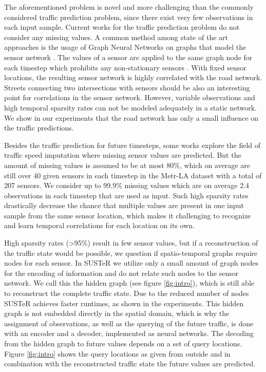 The aforementioned problem is novel and more challenging than the commonly considered traffic prediction problem, since there exist very few observations in each input sample.
Current works for the traffic prediction problem do not consider any missing values. \cite{Li2021, Shao22}
A common method among state of the art approaches is the usage of Graph Neural Networks on graphs that model the sensor network \cite{bui22}.
The values of a sensor are applied to the same graph node for each timestep which prohibits any non-stationary sensors . 
With fixed sensor locations, the resulting sensor network is highly correlated with the road network.
Streets connecting two intersections with sensors should be also an interesting point for correlations in the sensor network.
However, variable observations and high temporal sparsity rates can not be modeled adequately in a static network.
We show in our experiments that the road network has only a small influence on the traffic predictions.

Besides the traffic prediction for future timesteps, some works explore the field of traffic speed imputation \cite{Cini22, Cuza22} where missing sensor values are predicted.
But the amount of missing values is assumed to be at most 80\%, which on average are still over 40 given sensors in each timestep in the Metr-LA dataset with a total of 207 sensors.
We consider up to 99.9\% missing values which are on average 2.4 observations in each timestep that are used as input.
Such high sparsity rates drastically decrease the chance that multiple values are present in one input sample from the same sensor location, which makes it challenging to recognize and learn temporal correlations for each location on its own.

High sparsity rates (>95\%) result in few sensor values, but if a reconstruction of the traffic state would be possible, we question if spatio-temporal graphs require nodes for each sensor.
In SUSTeR we utilize only a small amount of graph nodes for the encoding of information and do not relate such nodes to the sensor network.
We call this the hidden graph (see figure \ref{fig:intro}), which is still able to reconstruct the complete traffic state.
Due to the reduced number of nodes SUSTeR achieves faster runtimes, as shown in the experiments.
This hidden graph is not embedded directly in the spatial domain, which is why the assignment of observations, as well as the querying of the future traffic, is done with an encoder and a decoder, implemented as neural networks.
The decoding from the hidden graph to future values depends on a set of query locations.
Figure \ref{fig:intro} shows the query locations as given from outside and in combination with the reconstructed traffic state the future values are predicted.

